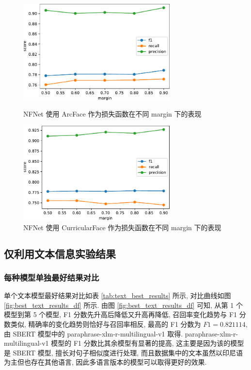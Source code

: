 \documentclass[12pt]{article}
\begin{document}
\begin{figure}[htbp]
  \centering
  \begin{minipage}[t]{0.48\textwidth}
    \centering
    \includegraphics[width=8cm]{nfnet_hp_arcface.pdf}
    \caption{NFNet 使用 ArcFace 作为损失函数在不同 margin 下的表现}
    \label{fig:nfnet_hp_arcface}
  \end{minipage}
  \begin{minipage}[t]{0.48\textwidth}
    \centering
    \includegraphics[width=8cm]{nfnet_hp_curface.pdf}
    \caption{NFNet 使用 CurricularFace 作为损失函数在不同 margin 下的表现}
    \label{fig:nfnet_hp_curface}
  \end{minipage}
\end{figure}

\subsection{仅利用文本信息实验结果}

\subsubsection{每种模型单独最好结果对比}

单个文本模型最好结果对比如表 \ref{tab:text_best_results} 所示, 对比曲线如图 \ref{fig:best_text_results_df} 所示. 由图 \ref{fig:best_text_results_df} 可知, 从第 1 个模型到第 5 个模型, F1 分数先升高后降低又升高再降低, 召回率变化趋势与 F1 分数类似, 精确率的变化趋势则恰好与召回率相反, 最高的 F1 分数为 $F1=0.821114$, 由 SBERT 模型中的 paraphrase-xlm-r-multilingual-v1 取得. paraphrase-xlm-r-multilingual-v1 模型的 F1 分数比其余模型有显著的提高, 这主要是因为该的模型是 SBERT 模型, 擅长对句子相似度进行处理, 而且数据集中的文本虽然以印尼语为主但也存在其他语言, 因此多语言版本的模型可以取得更好的效果.
\end{document}
